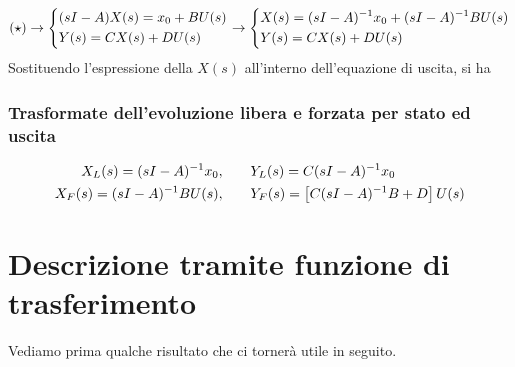 \begin{equation*}
(\star) \rightarrow
\begin{dcases}
(sI-A)X(s) = x_0 + BU(s) \\
Y(s) = CX(s) + DU(s) 
\end{dcases} \rightarrow \begin{dcases}
X(s) = (sI-A)^{-1}x_0 + (sI-A)^{-1}BU(s) \\
Y(s) = CX(s) + DU(s) 
\end{dcases}
\end{equation*}
Sostituendo l'espressione della $X(s)$ all'interno dell'equazione di uscita, si ha
\begin{center}
\end{center}
\subsubsection{Trasformate dell'evoluzione libera e forzata per stato ed uscita}
\begin{align}
X_L(s) = (sI-A)^{-1}x_0, \quad & \quad Y_L(s) = C(sI-A)^{-1}x_0 \\
\label{eq:forz}
X_F(s) = (sI-A)^{-1} BU(s), \quad & \quad Y_F(s) = \left[ C(sI-A)^{-1}B + D \right]U(s)
\end{align}

\section{Descrizione tramite funzione di trasferimento}
Vediamo prima qualche risultato che ci tornerà utile in seguito.
